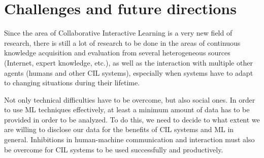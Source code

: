 \documentclass[conference]{IEEEtran}
\begin{document}
\section{Challenges and future directions}
Since the area of Collaborative Interactive Learning is a very new field of research, there is still a lot of 
research to be done in the areas of continuous knowledge acquisition 
and evaluation from several heterogeneous sources (Internet, expert knowledge, etc.), 
as well as the interaction with multiple other agents (humans and other CIL systems), 
especially when systems have to adapt to changing situations during their lifetime.

Not only technical difficulties have to be overcome, but also social ones. In order to use ML techniques effectively, 
at least a minimum amount of data has to be provided in order to be analyzed. To do this, we need to decide 
to what extent we are willing to disclose our data for the benefits of CIL systems and ML in general.
Inhibitions in human-machine communication and interaction must also be overcome for CIL systems to be used 
successfully and productively.
\end{document}
